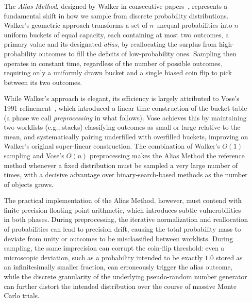 The \emph{Alias Method}, designed by Walker in consecutive papers~\cite{Walker74,Walker77}, represents a
fundamental shift in how we sample from discrete probability distributions. Walker's geometric approach
transforms a set of $n$ unequal probabilities into $n$ uniform buckets of equal capacity, each containing
at most two outcomes, a primary value and its designated \emph{alias}, by reallocating the surplus from
high-probability outcomes to fill the deficits of low-probability ones. Sampling then operates in constant
time, regardless of the number of possible outcomes, requiring only a uniformly drawn bucket and a single
biased coin flip to pick between its two outcomes.

While Walker's approach is elegant, its efficiency is largely attributed to Vose's 1991
refinement~\cite{Vose91}, which introduced a linear-time construction of the bucket table (a phase we call \emph{preprocessing} in what follows). Vose achieves this by maintaining two worklists (e.g., stacks)
classifying outcomes as small or large relative to the mean, and systematically pairing underfilled with
overfilled buckets, improving on Walker's original super-linear construction. The combination of Walker's
$O(1)$ sampling and Vose's $O(n)$ preprocessing makes the Alias Method the reference method whenever a fixed
distribution must be sampled a very large number of times, with a decisive advantage over
binary-search-based methods as the number of objects grows.

The practical implementation of the Alias Method, however, must contend with finite-precision floating-point
arithmetic, which introduces subtle vulnerabilities in both phases. During preprocessing, the iterative
normalization and reallocation of probabilities can lead to precision drift, causing the total probability
mass to deviate from unity or outcomes to be misclassified between worklists. During sampling, the same
imprecision can corrupt the coin-flip threshold: even a microscopic deviation, such as a probability
intended to be exactly $1.0$ stored as an infinitesimally smaller fraction, can erroneously trigger the
alias outcome, while the discrete granularity of the underlying pseudo-random number generator can further
distort the intended distribution over the course of massive Monte Carlo trials.

